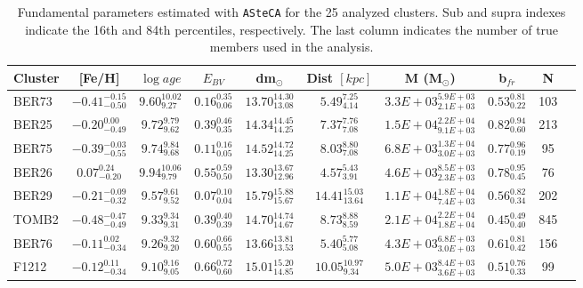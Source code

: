\documentclass{aa}
\begin{document}
  \begin{table}
  \caption{Fundamental parameters estimated with \texttt{ASteCA} for the
  25 analyzed clusters. Sub and supra indexes
  indicate the 16th and 84th percentiles, respectively. The last column
  indicates the number of true members used in the analysis.}
  \label{tab:results}
  \centering
  \begin{tabular}{lccccccccc}
  \hline\hline
  Cluster  & [Fe/H] & $\log{age}$ & $E_{BV}$ & dm$_{\odot}$ & Dist $[kpc]$ & M (M$_{\odot}$) & b$_{fr}$ & N\\
  \hline %
    BER73 & $-0.41_{-0.50}^{-0.15}$ & $9.60_{9.27}^{10.02}$ &
    $0.16_{0.06}^{0.35}$ & $13.70_{13.08}^{14.30}$ & $5.49_{4.14}^{7.25}$ &
    $3.3E+03_{2.1E+03}^{5.9E+03}$ & $0.53_{0.22}^{0.81}$ & 103 \\[.2cm]
    BER25 & $-0.20_{-0.49}^{0.00}$ & $9.72_{9.62}^{9.79}$ &
    $0.39_{0.35}^{0.46}$ & $14.34_{14.25}^{14.45}$ & $7.37_{7.08}^{7.76}$ &
    $1.5E+04_{9.1E+03}^{2.2E+04}$ & $0.82_{0.60}^{0.94}$ & 213 \\[.2cm]
    BER75 & $-0.39_{-0.55}^{-0.03}$ & $9.74_{9.68}^{9.84}$ &
    $0.11_{0.05}^{0.16}$ & $14.52_{14.25}^{14.72}$ & $8.03_{7.08}^{8.80}$ &
    $6.8E+03_{3.0E+03}^{1.3E+04}$ & $0.77_{0.19}^{0.96}$ & 95 \\[.2cm]
    BER26 & $0.07_{-0.20}^{0.24}$ & $9.94_{9.79}^{10.06}$ &
    $0.55_{0.50}^{0.59}$ & $13.30_{12.96}^{13.67}$ & $4.57_{3.91}^{5.43}$ &
    $4.6E+03_{2.3E+03}^{8.5E+03}$ & $0.78_{0.45}^{0.95}$ & 76 \\[.2cm]
    BER29 & $-0.21_{-0.32}^{-0.09}$ & $9.57_{9.52}^{9.61}$ &
    $0.07_{0.04}^{0.10}$ & $15.79_{15.67}^{15.88}$ & $14.41_{13.64}^{15.03}$ &
    $1.1E+04_{7.4E+03}^{1.8E+04}$ & $0.56_{0.34}^{0.82}$ & 202 \\[.2cm]
    TOMB2 & $-0.48_{-0.49}^{-0.47}$ & $9.33_{9.31}^{9.34}$ &
    $0.39_{0.39}^{0.40}$ & $14.70_{14.67}^{14.74}$ & $8.73_{8.59}^{8.88}$ &
    $2.1E+04_{1.8E+04}^{2.2E+04}$ & $0.45_{0.40}^{0.49}$ & 845 \\[.2cm]
    BER76 & $-0.11_{-0.34}^{0.02}$ & $9.26_{9.20}^{9.32}$ &
    $0.60_{0.55}^{0.66}$ & $13.66_{13.53}^{13.81}$ & $5.40_{5.08}^{5.77}$ &
    $4.3E+03_{3.0E+03}^{6.8E+03}$ & $0.61_{0.42}^{0.81}$ & 156 \\[.2cm]
    F1212 & $-0.12_{-0.34}^{0.11}$ & $9.10_{9.05}^{9.16}$ &
    $0.66_{0.60}^{0.72}$ & $15.01_{14.85}^{15.20}$ & $10.05_{9.34}^{10.97}$ &
    $5.0E+03_{3.6E+03}^{8.4E+03}$ & $0.51_{0.33}^{0.76}$ & 99 \\[.2cm]

\end{tabular}
\end{table}
\end{document}
